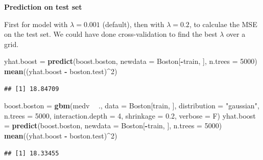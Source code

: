 \documentclass[10pt,ignorenonframetext,]{beamer}
\newenvironment{Shaded}{\begin{snugshade}}{\end{snugshade}}
\newcommand{\KeywordTok}[1]{\textcolor[rgb]{0.13,0.29,0.53}{\textbf{#1}}}
\newcommand{\DataTypeTok}[1]{\textcolor[rgb]{0.13,0.29,0.53}{#1}}
\newcommand{\DecValTok}[1]{\textcolor[rgb]{0.00,0.00,0.81}{#1}}
\newcommand{\FloatTok}[1]{\textcolor[rgb]{0.00,0.00,0.81}{#1}}
\newcommand{\StringTok}[1]{\textcolor[rgb]{0.31,0.60,0.02}{#1}}
\newcommand{\OperatorTok}[1]{\textcolor[rgb]{0.81,0.36,0.00}{\textbf{#1}}}
\newcommand{\NormalTok}[1]{#1}
\begin{document}
\begin{frame}[fragile]

\textbf{Prediction on test set}

First for model with \(\lambda=0.001\) (default), then with
\(\lambda=0.2\), to calculae the MSE on the test set. We could have done
cross-validation to find the best \(\lambda\) over a grid.

\scriptsize

\begin{Shaded}
\begin{Highlighting}[]
\NormalTok{yhat.boost =}\StringTok{ }\KeywordTok{predict}\NormalTok{(boost.boston, }\DataTypeTok{newdata =}\NormalTok{ Boston[}\OperatorTok{-}\NormalTok{train, ], }\DataTypeTok{n.trees =} \DecValTok{5000}\NormalTok{)}
\KeywordTok{mean}\NormalTok{((yhat.boost }\OperatorTok{-}\StringTok{ }\NormalTok{boston.test)}\OperatorTok{^}\DecValTok{2}\NormalTok{)}
\end{Highlighting}
\end{Shaded}

\begin{verbatim}
## [1] 18.84709
\end{verbatim}

\begin{Shaded}
\begin{Highlighting}[]
\NormalTok{boost.boston =}\StringTok{ }\KeywordTok{gbm}\NormalTok{(medv }\OperatorTok{~}\StringTok{ }\NormalTok{., }\DataTypeTok{data =}\NormalTok{ Boston[train, ], }\DataTypeTok{distribution =} \StringTok{"gaussian"}\NormalTok{, }
    \DataTypeTok{n.trees =} \DecValTok{5000}\NormalTok{, }\DataTypeTok{interaction.depth =} \DecValTok{4}\NormalTok{, }\DataTypeTok{shrinkage =} \FloatTok{0.2}\NormalTok{, }\DataTypeTok{verbose =}\NormalTok{ F)}
\NormalTok{yhat.boost =}\StringTok{ }\KeywordTok{predict}\NormalTok{(boost.boston, }\DataTypeTok{newdata =}\NormalTok{ Boston[}\OperatorTok{-}\NormalTok{train, ], }\DataTypeTok{n.trees =} \DecValTok{5000}\NormalTok{)}
\KeywordTok{mean}\NormalTok{((yhat.boost }\OperatorTok{-}\StringTok{ }\NormalTok{boston.test)}\OperatorTok{^}\DecValTok{2}\NormalTok{)}
\end{Highlighting}
\end{Shaded}

\begin{verbatim}
## [1] 18.33455
\end{verbatim}

\end{frame}
\end{document}

